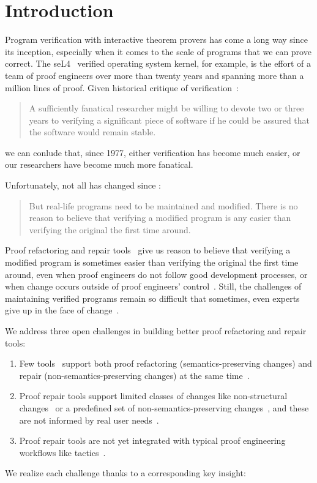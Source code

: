 \section{Introduction}

Program verification with interactive theorem provers has come a long way since its inception,
especially when it comes to the scale of programs that we can prove correct.
The seL4~\cite{Klein2009} verified operating system kernel, for example,
is the effort of a team of proof engineers over more than twenty years and spanning more than
a million lines of proof.
Given historical critique of verification~\cite{DeMillo1977}:

\begin{quote}
A sufficiently fanatical researcher 
might be willing to devote two or 
three years to verifying a significant 
piece of software if he could be 
assured that the software would remain stable.
\end{quote}
we can conlude that, since 1977, either verification has become much easier,
or our researchers have become much more fanatical.

Unfortunately, not all has changed since \citep{DeMillo1977}:

\begin{quote}
But real-life programs need to 
be maintained and modified. 
There is no reason to believe that verifying a modified program is any 
easier than verifying the original the 
first time around.
\end{quote}
Proof refactoring and repair tools~\cite{wibergh2019, WhitesidePhD, Dietrich2013,
adams2015, Bourke12, Roe2016, robert2018, pumpkinpatch} give us reason to believe
that verifying a modified program is sometimes easier than verifying the original the first time
around, even when proof engineers do not follow good development processes,
or when change occurs outside of proof engineers' control~\cite{PGL-045}.
Still, the challenges of maintaining verified programs remain so difficult that
sometimes, even experts give up in the face of change~\cite{replica}.

We address three open challenges in building better proof refactoring and repair tools:

\begin{enumerate}
\item Few tools~\cite{robert2018, wibergh2019} support both proof refactoring (semantics-preserving changes) and repair (non-semantics-preserving changes) at the same time~\cite{PGL-045}.
\item Proof repair tools support limited classes of changes like non-structural changes~\cite{pumpkinpatch} or a predefined set
of non-semantics-preserving changes~\cite{robert2018, wibergh2019}, and these are not informed by real user needs~\cite{replica}.
\item Proof repair tools are not yet integrated with typical proof engineering workflows like tactics~\cite{PGL-045, pumpkinpatch, robert2018}.
\end{enumerate}
We realize each challenge thanks to a corresponding key insight:

